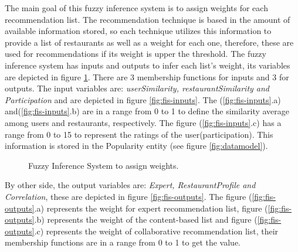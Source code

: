 The main goal of this fuzzy inference system is to assign weights for
each recommendation list. The recommendation technique is based in the
amount of available information stored, so each technique utilizes
this information to provide a list of restaurants as well as a weight
for each one, therefore, these are used for  recommendations if its
weight is upper the threshold.  The fuzzy inference system has inputs
and outputs to infer each list's weight, its variables are depicted in
figure \ref{fig:fis-pesos}.  There are 3 membership functions for
inputs and 3 for outputs. The input variables are:
\textit{userSimilarity, restaurantSimilarity and Participation} and
are depicted in figure \ref{fig:fis-inputs}. The (\ref{fig:fis-inputs}.a) 
and(\ref{fig:fis-inputs}.b) are in a range from 0 to 1 to
define the similarity average among users and restaurants,
respectively. The figure (\ref{fig:fis-inputs}.c) has a range from 0
to 15  to represent the ratings of the user(participation). This
information is stored in the Popularity entity (see figure
\ref{fig:datamodel}). \\
\begin{figure}
\captionsetup{justification=centering,margin=2cm,font=footnotesize}
\centering
{}
\caption{Fuzzy Inference System to assign weights.}
\label{fig:fis-pesos}       
\end{figure}
By other side, the output variables are: \textit{Expert,
RestaurantProfile and Correlation}, these are depicted in figure
\ref{fig:fis-outputs}. The figure (\ref{fig:fis-outputs}.a) represents
the weight for expert recommendation list, figure (\ref{fig:fis-outputs}.b) 
represents the weight of the content-based list and figure
(\ref{fig:fis-outputs}.c) represents the weight of collaborative
recommendation list, their membership functions are in a range from 0
to 1 to get the value.
